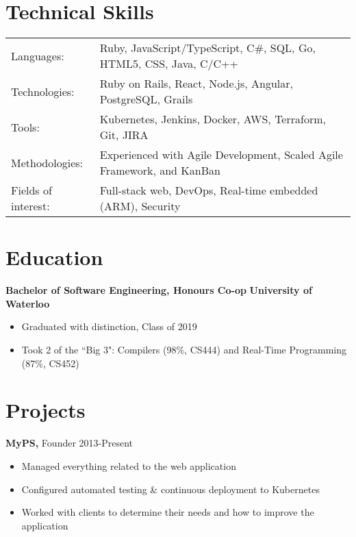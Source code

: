 \documentclass[line, centered]{res}
\begin{document}
\begin{resume}
	\section{Technical Skills}
	\begin{tabular}{l l}
		Languages:          & Ruby, JavaScript/TypeScript, C\#, SQL, Go, HTML5, CSS, Java, C/C++
		\\
		Technologies:       & Ruby on Rails, React, Node.js, Angular, PostgreSQL, Grails
		\\
		Tools:              & Kubernetes, Jenkins, Docker, AWS, Terraform, Git, JIRA
		\\
		Methodologies:      & Experienced with Agile Development, Scaled Agile Framework, and KanBan
		\\
		Fields of interest: & Full-stack web, DevOps, Real-time embedded (ARM), Security
	\end{tabular}


	\section{Education}
	\vspace{2pt}
	\textbf{Bachelor of Software Engineering, Honours Co-op} \hfill {\bf University of Waterloo}
	\begin{itemize} \itemsep -1pt
		\item Graduated with distinction, Class of 2019
		\item Took 2 of the ``Big 3": Compilers (98\%, CS444) and Real-Time Programming (87\%, CS452)
	\end{itemize}

	\section{Projects}
	{\bf MyPS,} Founder     \hfill 2013-Present
	\begin{itemize} \itemsep -1pt
		\item Managed everything related to the web application
		\item Configured automated testing \& continuous deployment to Kubernetes
		\item Worked with clients to determine their needs and how to improve the application
	\end{itemize}

\end{resume}
\end{document}
